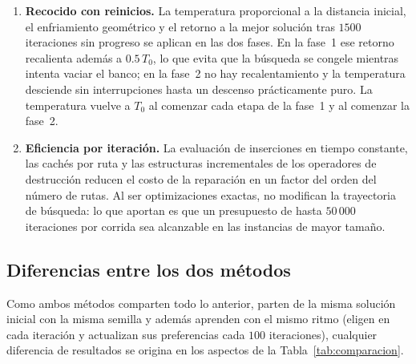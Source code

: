 \begin{enumerate}
aleatoria), de intensificación (extracción de peores, inserción voraz), de estructura (Shaw,
grupos, rutas), específicos de las ventanas de tiempo y con anticipación (arrepentimiento 2,
3, 4 y sobre todas las rutas). El ruido en los costos de inserción, activo en la mitad de las
iteraciones, diversifica cualquiera de las reparaciones.
\item \textbf{Recocido con reinicios.} La temperatura proporcional a la distancia inicial,
el enfriamiento geométrico y el retorno a la mejor solución tras $1500$ iteraciones sin
progreso se aplican en las dos fases. En la fase~1 ese retorno recalienta además a
$0.5\,T_0$, lo que evita que la búsqueda se congele mientras intenta vaciar el banco; en la
fase~2 no hay recalentamiento y la temperatura desciende sin interrupciones hasta un descenso
prácticamente puro. La temperatura vuelve a $T_0$ al comenzar cada etapa de la fase~1 y al
comenzar la fase~2.
\item \textbf{Eficiencia por iteración.} La evaluación de inserciones en tiempo constante, las
cachés por ruta y las estructuras incrementales de los operadores de destrucción reducen el
costo de la reparación en un factor del orden del número de rutas. Al ser optimizaciones
exactas, no modifican la trayectoria de búsqueda: lo que aportan es que un presupuesto de
hasta $50\,000$ iteraciones por corrida sea alcanzable en las instancias de mayor tamaño.
\end{enumerate}

\subsection{Diferencias entre los dos métodos}

Como ambos métodos comparten todo lo anterior, parten de la misma solución inicial con la
misma semilla y además aprenden con el mismo ritmo (eligen en cada iteración y actualizan sus
preferencias cada $100$ iteraciones), cualquier diferencia de resultados se origina en los
aspectos de la Tabla~\ref{tab:comparacion}.

